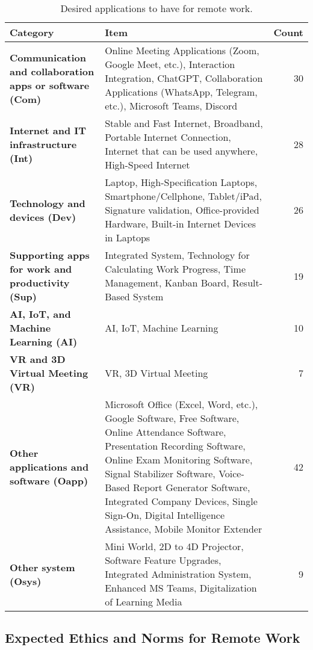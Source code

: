 \documentclass{infotel}
\begin{document}
\renewcommand{\arraystretch}{1.3}
\begin{table*}[ht]
	\centering
	\caption{Desired applications to have for remote work.}
	\label{tab:required_apps_for_remote_work}
	\begin{tabular}{p{} p{} r}
		\hline
		\textbf{Category} & \textbf{Item} & \textbf{Count} \\ 
		\hline
		\textbf{Communication and collaboration apps or software (Com)} & Online Meeting Applications (Zoom, Google Meet, etc.), Interaction Integration, ChatGPT, Collaboration Applications (WhatsApp, Telegram, etc.), Microsoft Teams, Discord & 30 \\ 
		\textbf{Internet and IT infrastructure (Int)} & Stable and Fast Internet, Broadband, Portable Internet Connection, Internet that can be used anywhere, High-Speed Internet & 28 \\ 
		\textbf{Technology and devices (Dev)} & Laptop, High-Specification Laptops, Smartphone/Cellphone, Tablet/iPad, Signature validation, Office-provided Hardware, Built-in Internet Devices in Laptops & 26 \\ 
		\textbf{Supporting apps for work and productivity (Sup)} & Integrated System, Technology for Calculating Work Progress, Time Management, Kanban Board, Result-Based System & 19 \\ 
		\textbf{AI, IoT, and Machine Learning (AI)} & AI, IoT, Machine Learning & 10 \\ 
		\textbf{VR and 3D Virtual Meeting (VR)} & VR, 3D Virtual Meeting & 7 \\ 
		\textbf{Other applications and software (Oapp)} & Microsoft Office (Excel, Word, etc.), Google Software, Free Software, Online Attendance Software, Presentation Recording Software, Online Exam Monitoring Software, Signal Stabilizer Software, Voice-Based Report Generator Software, Integrated Company Devices, Single Sign-On, Digital Intelligence Assistance, Mobile Monitor Extender & 42 \\ 
		\textbf{Other system (Osys)} & Mini World, 2D to 4D Projector, Software Feature Upgrades, Integrated Administration System, Enhanced MS Teams, Digitalization of Learning Media & 9 \\ 
		\hline
	\end{tabular}
\end{table*}



\subsection{Expected Ethics and Norms for Remote Work}
\label{sec:ethics-remote-work}
\end{document}
